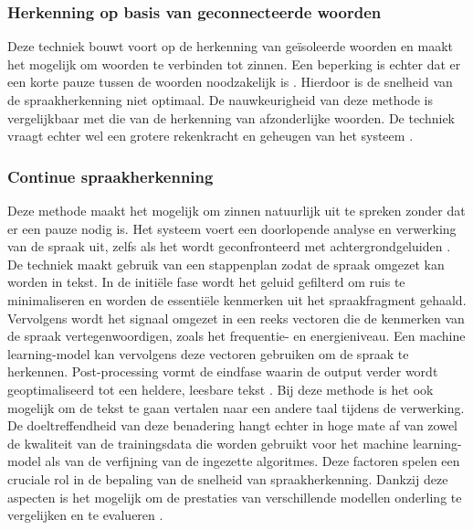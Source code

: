 \subsubsection{Herkenning op basis van geconnecteerde woorden}
Deze techniek bouwt voort op de herkenning van geïsoleerde woorden en maakt het mogelijk om woorden te verbinden tot zinnen. Een beperking is echter dat er een korte pauze tussen de woorden noodzakelijk is \autocite{Maenobu1984}. Hierdoor is de snelheid van de spraakherkenning niet optimaal. De nauwkeurigheid van deze methode is vergelijkbaar met die van de herkenning van afzonderlijke woorden. De techniek vraagt echter wel een grotere rekenkracht en geheugen van het systeem \autocite{Anusuya2009}.

\subsubsection{Continue spraakherkenning}
Deze methode maakt het mogelijk om zinnen natuurlijk uit te spreken zonder dat er een pauze nodig is. Het systeem voert een doorlopende analyse en verwerking van de spraak uit, zelfs als het wordt geconfronteerd met achtergrondgeluiden \autocite{Anusuya2009}. De techniek maakt gebruik van een stappenplan zodat de spraak omgezet kan worden in tekst. In de initiële fase wordt het geluid gefilterd om ruis te minimaliseren en worden de essentiële kenmerken uit het spraakfragment gehaald. Vervolgens wordt het signaal omgezet in een reeks vectoren die de kenmerken van de spraak vertegenwoordigen, zoals het frequentie- en energieniveau. Een machine learning-model kan vervolgens deze vectoren gebruiken om de spraak te herkennen. Post-processing vormt de eindfase waarin de output verder wordt geoptimaliseerd tot een heldere, leesbare tekst \autocite{Bhatt2020}. Bij deze methode is het ook mogelijk om de tekst te gaan vertalen naar een andere taal tijdens de verwerking. De doeltreffendheid van deze benadering hangt echter in hoge mate af van zowel de kwaliteit van de trainingsdata die worden gebruikt voor het machine learning-model als van de verfijning van de ingezette algoritmes. Deze factoren spelen een cruciale rol in de bepaling van de snelheid van spraakherkenning. Dankzij deze aspecten is het mogelijk om de prestaties van verschillende modellen onderling te vergelijken en te evalueren \autocite{Bhatt2020}.

